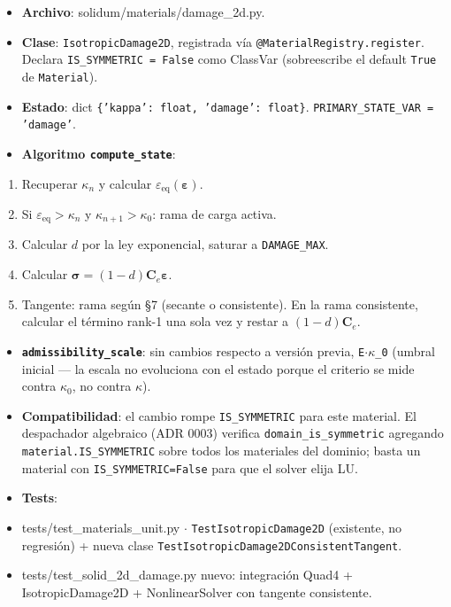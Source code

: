 \documentclass[11pt,letterpaper,oneside]{report}
\begin{document}
\begin{itemize}
  \item \textbf{Archivo}: solidum/materials/damage\_2d.py.
  \item \textbf{Clase}: \texttt{IsotropicDamage2D}, registrada vía \texttt{@MaterialRegistry.register}. Declara \texttt{IS\_SYMMETRIC = False} como ClassVar (sobreescribe el default \texttt{True} de \texttt{Material}).
  \item \textbf{Estado}: dict \texttt{\{'kappa': float, 'damage': float\}}. \texttt{PRIMARY\_STATE\_VAR = 'damage'}.
  \item \textbf{Algoritmo \texttt{compute\_state}}:
\end{itemize}
\begin{enumerate}
  \item Recuperar $\kappa_n$ y calcular $\varepsilon_\text{eq}(\boldsymbol\varepsilon)$.
  \item Si $\varepsilon_\text{eq} > \kappa_n$ y $\kappa_{n+1} > \kappa_0$: rama de carga activa.
  \item Calcular $d$ por la ley exponencial, saturar a \texttt{DAMAGE\_MAX}.
  \item Calcular $\boldsymbol\sigma = (1-d)\mathbf C_e\boldsymbol\varepsilon$.
  \item Tangente: rama según §7 (secante o consistente). En la rama consistente, calcular el término rank-1 una sola vez y restar a $(1-d)\mathbf C_e$.
\end{enumerate}
\begin{itemize}
  \item \textbf{\texttt{admissibility\_scale}}: sin cambios respecto a versión previa, \texttt{E\ensuremath{\cdot}\ensuremath{\kappa}\_0} (umbral inicial --- la escala no evoluciona con el estado porque el criterio se mide contra $\kappa_0$, no contra $\kappa$).
  \item \textbf{Compatibilidad}: el cambio rompe \texttt{IS\_SYMMETRIC} para este material. El despachador algebraico (ADR 0003) verifica \texttt{domain\_is\_symmetric} agregando \texttt{material.IS\_SYMMETRIC} sobre todos los materiales del dominio; basta un material con \texttt{IS\_SYMMETRIC=False} para que el solver elija LU.
  \item \textbf{Tests}:
  \item tests/test\_materials\_unit.py \ensuremath{\cdot} \texttt{TestIsotropicDamage2D} (existente, no regresión) + nueva clase \texttt{TestIsotropicDamage2DConsistentTangent}.
  \item tests/test\_solid\_2d\_damage.py nuevo: integración Quad4 + IsotropicDamage2D + NonlinearSolver con tangente consistente.
\end{itemize}
\end{document}
